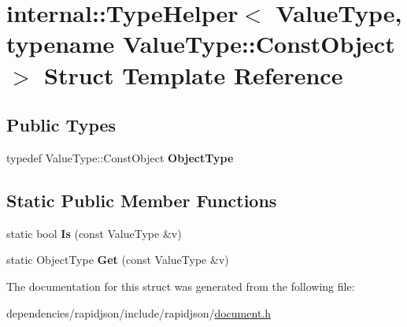 \hypertarget{structinternal_1_1_type_helper_3_01_value_type_00_01typename_01_value_type_1_1_const_object_01_4}{}\section{internal\+:\+:Type\+Helper$<$ Value\+Type, typename Value\+Type\+:\+:Const\+Object $>$ Struct Template Reference}
\label{structinternal_1_1_type_helper_3_01_value_type_00_01typename_01_value_type_1_1_const_object_01_4}
\subsection*{Public Types}
\begin{DoxyCompactItemize}
\item 
\mbox{\label{structinternal_1_1_type_helper_3_01_value_type_00_01typename_01_value_type_1_1_const_object_01_4_a986df6ac09ceb6cc9ba9fd4d73e90495}} 
typedef Value\+Type\+::\+Const\+Object {\bfseries Object\+Type}
\end{DoxyCompactItemize}
\subsection*{Static Public Member Functions}
\begin{DoxyCompactItemize}
\item 
\mbox{\label{structinternal_1_1_type_helper_3_01_value_type_00_01typename_01_value_type_1_1_const_object_01_4_a843e707732c55f2178d399a0af13605a}} 
static bool {\bfseries Is} (const Value\+Type \&v)
\item 
\mbox{\label{structinternal_1_1_type_helper_3_01_value_type_00_01typename_01_value_type_1_1_const_object_01_4_ae6a797157c9b3d15ca4a32c48ea4bc73}} 
static Object\+Type {\bfseries Get} (const Value\+Type \&v)
\end{DoxyCompactItemize}


The documentation for this struct was generated from the following file\+:\begin{DoxyCompactItemize}
\item 
dependencies/rapidjson/include/rapidjson/\hyperlink{document_8h}{document.\+h}\end{DoxyCompactItemize}
